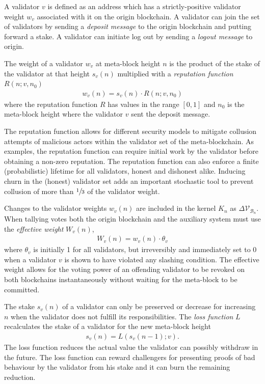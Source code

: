 \documentclass[12pt,a4paper]{article}
\begin{document}
A validator $v$ is defined as an address which has a strictly-positive validator weight $w_v$ associated with it on the origin blockchain.
A validator can join the set of validators by sending a \emph{deposit message} to the origin blockchain and putting forward a stake.
A validator can initiate log out by sending a \emph{logout message} to origin.

The weight of a validator $w_v$ at meta-block height $n$ is the product of the stake of the validator at that height $s_v(n)$ multiplied with a \emph{reputation function} $R(n; v, n_0)$
\begin{align}
\label{validator_weights}
  w_v(n) = s_v(n) \cdot R(n; v, n_0)
\end{align}
where the reputation function $R$ has values in the range $[0,1]$ and $n_0$ is the meta-block height where the validator $v$ sent the deposit message.

The reputation function allows for different security models to mitigate collusion attempts of malicious actors within the validator set of the meta-blockchain.
As examples, the reputation function can require initial work by the validator before obtaining a non-zero reputation.
The reputation function can also enforce a finite (probabilistic) lifetime for all validators, honest and dishonest alike.
Inducing churn in the (honest) validator set adds an important stochastic tool to prevent collusion of more than $\sfrac{1}{3}$ of the validator weight.

Changes to the validator weights $w_v(n)$ are included in the kernel $K_n$ as $\Delta\mathcal{V}_{\mathcal{B}_n}$.  When tallying votes both the origin blockchain and the auxiliary system must use the \emph{effective weight} $W_v(n)$,
\begin{align*}
  W_v(n) = w_v(n) \cdot \theta_v
\end{align*}
where $\theta_v$ is initially 1 for all validators, but irreversibly and immediately set to 0 when a validator $v$ is shown to have violated any slashing condition.
The effective weight allows for the voting power of an offending validator to be revoked on both blockchains instantaneously without waiting for the meta-block to be committed.

The stake $s_v(n)$ of a validator can only be preserved or decrease for increasing $n$ when the validator does not fulfill its responsibilities.
The \emph{loss function} $L$ recalculates the stake of a validator for the new meta-block height
\begin{align}
  s_v(n) = L(s_v(n-1); v).
\end{align}
The loss function reduces the actual value the validator can possibly withdraw in the future.  The loss function can reward challengers for presenting proofs of bad behaviour by the validator from his stake and it can burn the remaining reduction.
\end{document}
